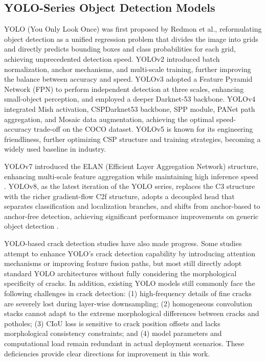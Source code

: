 \documentclass[twocolumn]{sn-jnl}
\begin{document}
	\subsection{YOLO-Series Object Detection Models}
	YOLO (You Only Look Once) was first proposed by Redmon et al., reformulating object detection as a unified regression problem that divides the image into grids and directly predicts bounding boxes and class probabilities for each grid, achieving unprecedented detection speed. YOLOv2 introduced batch normalization, anchor mechanisms, and multi-scale training, further improving the balance between accuracy and speed. YOLOv3 adopted a Feature Pyramid Network (FPN) to perform independent detection at three scales, enhancing small-object perception, and employed a deeper Darknet-53 backbone. YOLOv4 integrated Mish activation, CSPDarknet53 backbone, SPP module, PANet path aggregation, and Mosaic data augmentation, achieving the optimal speed-accuracy trade-off on the COCO dataset. YOLOv5 is known for its engineering friendliness, further optimizing CSP structure and training strategies, becoming a widely used baseline in industry.
	
	YOLOv7 introduced the ELAN (Efficient Layer Aggregation Network) structure, enhancing multi-scale feature aggregation while maintaining high inference speed \cite{Wang2023}. YOLOv8, as the latest iteration of the YOLO series, replaces the C3 structure with the richer gradient-flow C2f structure, adopts a decoupled head that separates classification and localization branches, and shifts from anchor-based to anchor-free detection, achieving significant performance improvements on generic object detection \cite{Jocher2023}.
	
	YOLO-based crack detection studies have also made progress. Some studies attempt to enhance YOLO's crack detection capability by introducing attention mechanisms or improving feature fusion paths, but most still directly adopt standard YOLO architectures without fully considering the morphological specificity of cracks. In addition, existing YOLO models still commonly face the following challenges in crack detection: (1) high-frequency details of fine cracks are severely lost during layer-wise downsampling; (2) homogeneous convolution stacks cannot adapt to the extreme morphological differences between cracks and potholes; (3) CIoU loss is sensitive to crack position offsets and lacks morphological consistency constraints; and (4) model parameters and computational load remain redundant in actual deployment scenarios. These deficiencies provide clear directions for improvement in this work.
	
\end{document}

